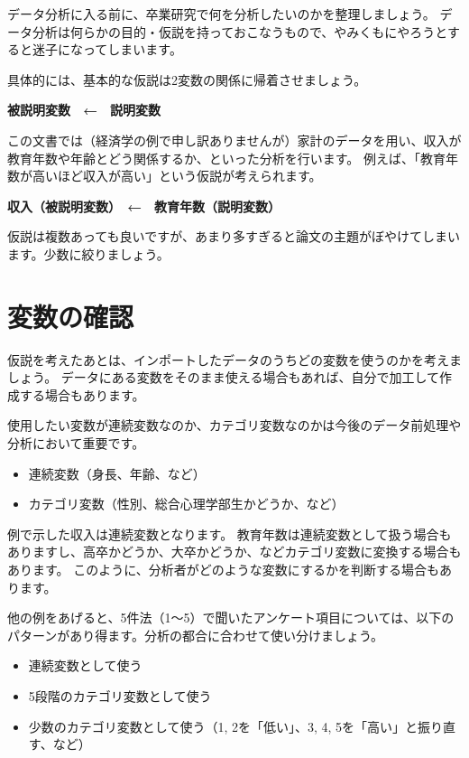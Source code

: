 \documentclass[
]{book}
\providecommand{\tightlist}{%
  \setlength{\itemsep}{0pt}\setlength{\parskip}{0pt}}
\begin{document}
データ分析に入る前に、卒業研究で何を分析したいのかを整理しましょう。
データ分析は何らかの目的・仮説を持っておこなうもので、やみくもにやろうとすると迷子になってしまいます。

具体的には、基本的な仮説は2変数の関係に帰着させましょう。

\textbf{被説明変数　←　説明変数}

この文書では（経済学の例で申し訳ありませんが）家計のデータを用い、収入が教育年数や年齢とどう関係するか、といった分析を行います。
例えば、「教育年数が高いほど収入が高い」という仮説が考えられます。

\textbf{収入（被説明変数）　←　教育年数（説明変数）}

仮説は複数あっても良いですが、あまり多すぎると論文の主題がぼやけてしまいます。少数に絞りましょう。

\hypertarget{ux5909ux6570ux306eux78baux8a8d}{%
\section{変数の確認}\label{ux5909ux6570ux306eux78baux8a8d}}

仮説を考えたあとは、インポートしたデータのうちどの変数を使うのかを考えましょう。
データにある変数をそのまま使える場合もあれば、自分で加工して作成する場合もあります。

使用したい変数が連続変数なのか、カテゴリ変数なのかは今後のデータ前処理や分析において重要です。

\begin{itemize}
\tightlist
\item
  連続変数（身長、年齢、など）
\item
  カテゴリ変数（性別、総合心理学部生かどうか、など）
\end{itemize}

例で示した収入は連続変数となります。
教育年数は連続変数として扱う場合もありますし、高卒かどうか、大卒かどうか、などカテゴリ変数に変換する場合もあります。
このように、分析者がどのような変数にするかを判断する場合もあります。

他の例をあげると、5件法（1〜5）で聞いたアンケート項目については、以下のパターンがあり得ます。分析の都合に合わせて使い分けましょう。

\begin{itemize}
\tightlist
\item
  連続変数として使う
\item
  5段階のカテゴリ変数として使う
\item
  少数のカテゴリ変数として使う（1, 2を「低い」、3, 4, 5を「高い」と振り直す、など）
\end{itemize}
\end{document}
